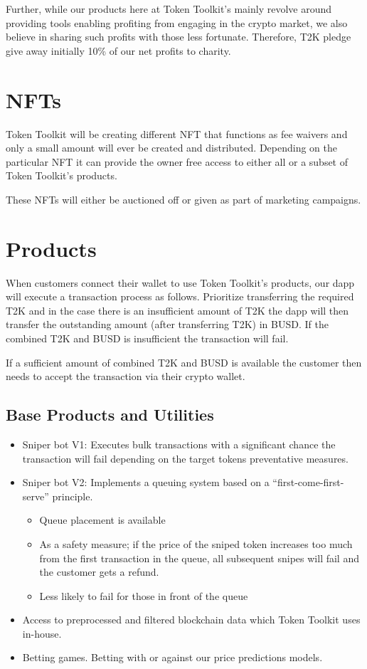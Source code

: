 \documentclass[11pt]{article}
\begin{document}
Further, while our products here at Token Toolkit's mainly revolve around
providing tools enabling profiting from engaging in the crypto market, we also
believe in sharing such profits with those less fortunate. Therefore, T2K pledge
give away initially 10\% of our net profits to charity.

\section*{NFTs}
\label{sec:org18771e4}

Token Toolkit will be creating different NFT that functions as fee waivers and
only a small amount will ever be created and distributed. Depending on the
particular NFT it can provide the owner free access to either all or a subset of
Token Toolkit's products.

These NFTs will either be auctioned off or given as part of marketing campaigns.

\section*{Products}
\label{sec:org4892258}

When customers connect their wallet to use Token Toolkit's products, our dapp
will execute a transaction process as follows. Prioritize transferring the
required T2K and in the case there is an insufficient amount of T2K the dapp
will then transfer the outstanding amount (after transferring T2K) in BUSD. If
the combined T2K and BUSD is insufficient the transaction will fail.

If a sufficient amount of combined T2K and BUSD is available the customer then
needs to accept the transaction via their crypto wallet.

\subsection*{Base Products and Utilities}
\label{sec:org6356dd3}

\begin{itemize}
\item Sniper bot V1: Executes bulk transactions with a significant chance the
transaction will fail depending on the target tokens preventative measures.
\item Sniper bot V2: Implements a queuing system based on a ``first-come-first-serve'' principle.
\begin{itemize}
\item Queue placement is available
\item As a safety measure; if the price of the sniped token increases too much
from the first transaction in the queue, all subsequent snipes will fail and the customer gets a refund.
\item Less likely to fail for those in front of the queue
\end{itemize}
\item Access to preprocessed and filtered blockchain data which Token Toolkit uses in-house.
\item Betting games. Betting with or against our price predictions models.
\end{itemize}
\end{document}
